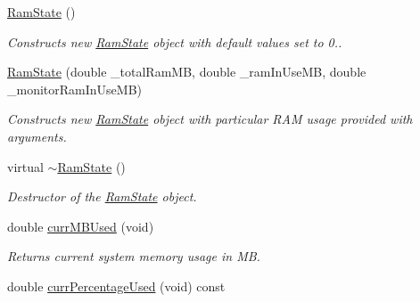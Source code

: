 \begin{DoxyCompactItemize}
\item 
\hyperlink{classRamState_abc3cc6520b534a0bcf09a934927c9e93}{Ram\+State} ()\hypertarget{classRamState_abc3cc6520b534a0bcf09a934927c9e93}{}\label{classRamState_abc3cc6520b534a0bcf09a934927c9e93}

\begin{DoxyCompactList}\small\item\em Constructs new \hyperlink{classRamState}{Ram\+State} object with default values set to 0.. \end{DoxyCompactList}\item 
\hyperlink{classRamState_a4912c894e281046584ea3bf2b1b29b00}{Ram\+State} (double \+\_\+total\+Ram\+MB, double \+\_\+ram\+In\+Use\+MB, double \+\_\+monitor\+Ram\+In\+Use\+MB)\hypertarget{classRamState_a4912c894e281046584ea3bf2b1b29b00}{}\label{classRamState_a4912c894e281046584ea3bf2b1b29b00}

\begin{DoxyCompactList}\small\item\em Constructs new \hyperlink{classRamState}{Ram\+State} object with particular R\+AM usage provided with arguments. \end{DoxyCompactList}\item 
virtual \hyperlink{classRamState_ad82922bd4750922fc080f7f0b8ed302f}{$\sim$\+Ram\+State} ()\hypertarget{classRamState_ad82922bd4750922fc080f7f0b8ed302f}{}\label{classRamState_ad82922bd4750922fc080f7f0b8ed302f}

\begin{DoxyCompactList}\small\item\em Destructor of the \hyperlink{classRamState}{Ram\+State} object. \end{DoxyCompactList}\item 
double \hyperlink{classRamState_a4dfe7387bb173f4d728e0229a51e3dde}{curr\+M\+B\+Used} (void)\hypertarget{classRamState_a4dfe7387bb173f4d728e0229a51e3dde}{}\label{classRamState_a4dfe7387bb173f4d728e0229a51e3dde}

\begin{DoxyCompactList}\small\item\em Returns current system memory usage in MB. \end{DoxyCompactList}\item 
double \hyperlink{classRamState_a53f3328ae46b132087672607052e5505}{curr\+Percentage\+Used} (void) const \hypertarget{classRamState_a53f3328ae46b132087672607052e5505}{}\label{classRamState_a53f3328ae46b132087672607052e5505}


\end{DoxyCompactItemize}
